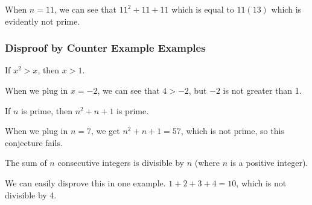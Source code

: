 \documentclass[../maths.tex]{subfiles}
\begin{document}
When $n=11$, we can see that $11^2+11+11$ which is equal to $11(13)$ which is evidently not prime.

\subsubsection*{Disproof by Counter Example Examples}
\begin{example}
    If $x^2>x$, then $x>1$. 

    When we plug in $x=-2$, we can see that $4>-2$, but $-2$ is not greater than 1.
\end{example}

\begin{example}
    If $n$ is prime, then $n^2+n+1$ is prime.

    When we plug in $n=7$, we get $n^2+n+1=57$, which is not prime, so this conjecture fails.
\end{example}

\begin{example}
    The sum of $n$ consecutive integers is divisible by $n$ (where $n$ is a positive integer).

    We can easily disprove this in one example. $1+2+3+4=10$, which is not divisible by 4.
\end{example}
\end{document}
